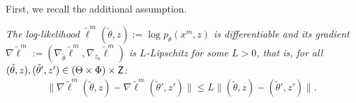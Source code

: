 First, we recall the additional assumption.
\begin{trivlist}
\item[\hskip\labelsep \textbf{Assumption}~\ref{assump:lipschitz_grad} (Lipschitz gradient).]\itshape
The log-likelihood $\tilde\ell^m(\tilde\theta, z):= \log p_{\tilde\theta}(x^m, z)$ is differentiable and its gradient $\nabla \tilde\ell^m := (\nabla_{\tilde\theta}\tilde\ell^m, \nabla_{z_0}\tilde\ell^m)$ is $L$-Lipschitz for some $L > 0$, that is, for all $(\tilde\theta, z), (\tilde\theta', z') \in (\Theta \times \Phi) \times {\mathsf{Z}}$:
\begin{align*}
    \|\nabla \tilde\ell^m(\tilde\theta, z) - \nabla \tilde\ell^m(\tilde\theta', z')\|\leq L\|(\tilde\theta, z) - (\tilde\theta', z')\|.
\end{align*}
\end{trivlist}

